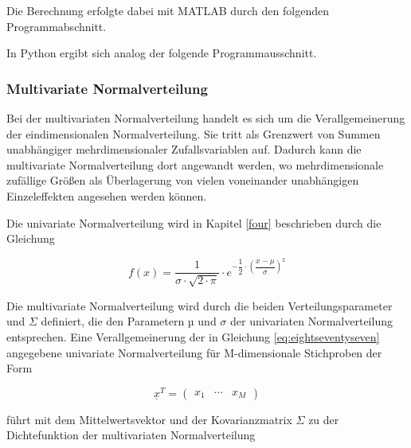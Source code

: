 \clearpage

\noindent Die Berechnung erfolgte dabei mit MATLAB durch den folgenden Programmabschnitt.



\noindent In Python ergibt sich analog der folgende Programmausschnitt.



\subsubsection{Multivariate Normalverteilung}

\noindent Bei der multivariaten Normalverteilung handelt es sich um die Verallgemeinerung der eindimensionalen Normalverteilung. Sie tritt als Grenzwert von Summen unabh\"{a}ngiger mehrdimensionaler Zufallsvariablen auf. Dadurch kann die multivariate Normalverteilung dort angewandt werden, wo mehrdimensionale zuf\"{a}llige Gr\"{o}{\ss}en als \"{U}berlagerung von vielen voneinander unabh\"{a}ngigen Einzeleffekten angesehen werden k\"{o}nnen.\newline

\noindent Die univariate Normalverteilung wird in Kapitel \ref{four} beschrieben durch die Gleichung

\begin{equation}\label{eq:eightseventyseven}
f(x)=\dfrac{1}{\sigma \cdot \sqrt{2\cdot \pi}} \cdot e^{-\dfrac{1}{2} \cdot \left(\dfrac{x-\mu}{\sigma} \right)^{2}}
\end{equation}

\noindent Die multivariate Normalverteilung wird durch die beiden Verteilungsparameter \underbar{$\mu$} und \textbf{$\Sigma$} definiert, die den Parametern µ und $\sigma$ der univariaten Normalverteilung entsprechen. Eine Verallgemeinerung der in Gleichung \eqref{eq:eightseventyseven} angegebene univariate Normalverteilung f\"{u}r M-dimensionale Stichproben der Form

\begin{equation}\label{eq:eightseventyeight}
\underline{x}^{T} =\left(\begin{array}{ccc} {x_{1} } & {\cdots } & {x_{M} } \end{array}\right)
\end{equation}

\noindent f\"{u}hrt mit dem Mittelwertsvektor \underbar{$\mu$} und der Kovarianzmatrix \textbf{$\Sigma$} zu der Dichtefunktion der multivariaten Normalverteilung

